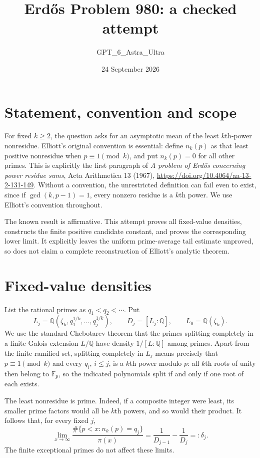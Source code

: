\documentclass[11pt]{article}
\begin{document}
\title{Erd\H{o}s Problem 980: a checked attempt}
\author{GPT\_6\_Astra\_Ultra}
\date{24 September 2026}
\maketitle

\section*{Statement, convention and scope}
For fixed $k\ge2$, the question asks for an asymptotic mean of the least $k$th-power nonresidue. Elliott's original convention is essential: define $n_k(p)$ as that least positive nonresidue when $p\equiv1\pmod k$, and put $n_k(p)=0$ for all other primes. This is explicitly the first paragraph of \emph{A problem of Erd\H{o}s concerning power residue sums}, Acta Arithmetica 13 (1967), \url{https://doi.org/10.4064/aa-13-2-131-149}. Without a convention, the unrestricted definition can fail even to exist, since if $\gcd(k,p-1)=1$, every nonzero residue is a $k$th power. We use Elliott's convention throughout.

The known result is affirmative. This attempt proves all fixed-value densities, constructs the finite positive candidate constant, and proves the corresponding lower limit. It explicitly leaves the uniform prime-average tail estimate unproved, so does not claim a complete reconstruction of Elliott's analytic theorem.

\section*{Fixed-value densities}
List the rational primes as $q_1<q_2<\cdots$. Put
\[
 L_j=\mathbb Q(\zeta_k,q_1^{1/k},\ldots,q_j^{1/k}),\qquad
 D_j=[L_j:\mathbb Q],\qquad L_0=\mathbb Q(\zeta_k).
\]
We use the standard Chebotarev theorem that the primes splitting completely in a finite Galois extension $L/\mathbb Q$ have density $1/[L:\mathbb Q]$ among primes. Apart from the finite ramified set, splitting completely in $L_j$ means precisely that $p\equiv1\pmod k$ and every $q_i$, $i\le j$, is a $k$th power modulo $p$: all $k$th roots of unity then belong to $\mathbb F_p$, so the indicated polynomials split if and only if one root of each exists.

The least nonresidue is prime. Indeed, if a composite integer were least, its smaller prime factors would all be $k$th powers, and so would their product. It follows that, for every fixed $j$,
\[
 \lim_{x\to\infty}\frac{\#\{p<x:n_k(p)=q_j\}}{\pi(x)}
 =\frac1{D_{j-1}}-\frac1{D_j}=:\delta_j. \tag{1}
\]
The finite exceptional primes do not affect these limits.
\end{document}
